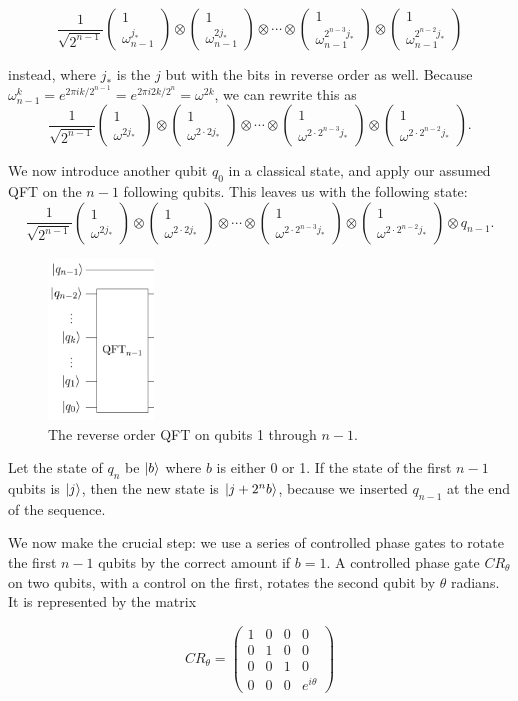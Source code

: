 \documentclass[11pt]{report}
\newcommand{\?}{\stackrel{?}{=}}
\newcommand{\qcol}[2]{\ensuremath{\begin{pmatrix} #1 \\ #2 \end{pmatrix}}}
\begin{document}
$$\frac{1}{\sqrt{2^{n-1}}} 
  \qcol{1}{\omega_{n-1}^{j_*}}
  \otimes
  \qcol{1}{\omega_{n-1}^{2j_*}}
  \otimes \cdots \otimes
  \qcol{1}{\omega_{n-1}^{2^{n-3}j_*}}
  \otimes
  \qcol{1}{\omega_{n-1}^{2^{n-2}j_*}}$$
  
instead, where $j_*$ is the $j$ but with the bits in reverse order as well. Because $\omega_{n-1}^{k} = e^{2\pi i k / 2^{n-1}} = e^{2\pi i 2k / 2^n} = \omega^{2k}$, we can rewrite this as
$$\frac{1}{\sqrt{2^{n-1}}} 
  \qcol{1}{\omega^{2j_*}}
  \otimes
  \qcol{1}{\omega^{2\cdot2j_*}}
  \otimes \cdots \otimes
  \qcol{1}{\omega^{2\cdot2^{n-3}j_*}}
  \otimes
  \qcol{1}{\omega^{2\cdot2^{n-2}j_*}}.$$
  
We now introduce another qubit $q_0$ in a classical state, and apply our assumed QFT on the $n-1$ following qubits. This leaves us with the following state:
$$\frac{1}{\sqrt{2^{n-1}}} 
  \qcol{1}{\omega^{2j_*}}
  \otimes
  \qcol{1}{\omega^{2\cdot2j_*}}
  \otimes \cdots \otimes
  \qcol{1}{\omega^{2\cdot2^{n-3}j_*}}
  \otimes
  \qcol{1}{\omega^{2\cdot2^{n-2}j_*}}
  \otimes q_{n-1}.$$
  
\begin{figure}[h]
\centering
\includegraphics[width=0.25\textwidth]{resources/images/qft1.png}
\caption{\label{fig:qft1}The reverse order QFT on qubits 1 through $n-1$.}
\end{figure}

Let the state of $q_n$ be $\Ket{b}$ where $b$ is either 0 or 1. If the state of the first $n-1$ qubits is $\Ket{j}$, then the new state is $\Ket{j + 2^nb}$, because we inserted $q_{n-1}$ at the end of the sequence.

We now make the crucial step: we use a series of controlled phase gates to rotate the first $n-1$ qubits by the correct amount if $b = 1$. A controlled phase gate $CR_\theta$ on two qubits, with a control on the first, rotates the second qubit by $\theta$ radians. It is represented by the matrix

$$CR_\theta = \begin{pmatrix}
1 & 0 & 0 & 0 \\
0 & 1 & 0 & 0 \\
0 & 0 & 1 & 0 \\
0 & 0 & 0 & e^{i\theta}
\end{pmatrix}$$
\end{document}
